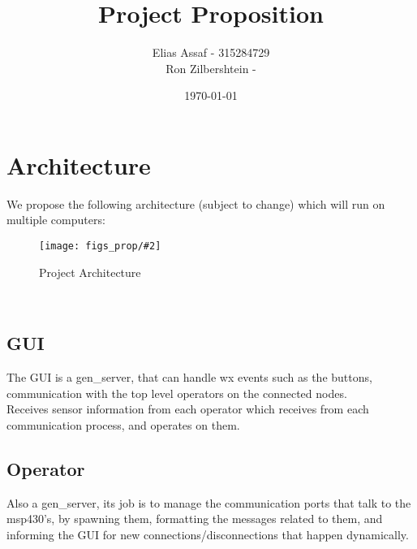 \documentclass{article}
\title{Project Proposition}
\author{Elias Assaf - 315284729\\
        Ron Zilbershtein - }
\date{\today}
\newcommand{\myfig}[4]{
\begin{figure}[h]
    \centering
    \captionsetup{justification=centering}
    \texttt{[image: figs\_prop/\#2]}
    \caption{#3}
    \label{fig:#4}
\end{figure}
}
\begin{document}
\maketitle
 
 \section{Architecture}
  We propose the following architecture (subject to change) which will run on multiple computers:
 \myfig{0.9}{Project_flow.drawio.png}{Project Architecture}{}\\

\subsection{GUI}
The GUI is a gen\_server, that can handle wx events such as the buttons, communication with the top level operators on the connected nodes.\\
Receives sensor information from each operator which receives from each communication process, and operates on them.
\subsection{Operator}
Also a gen\_server, its job is to manage the communication ports that talk to the msp430's, by spawning them, formatting the messages related to them, and informing the GUI for new connections/disconnections that happen dynamically.
\newpage
\end{document}
